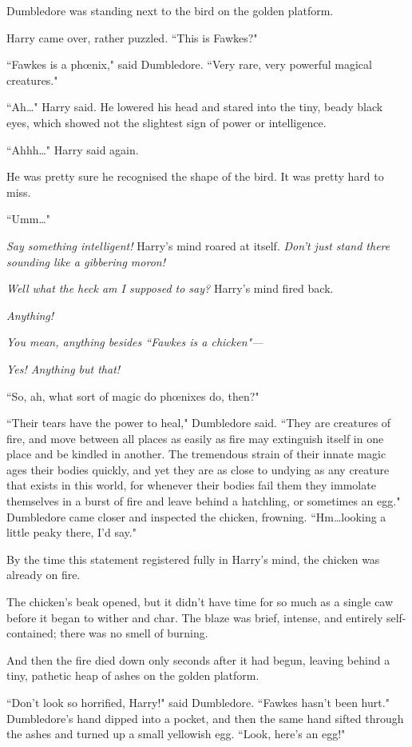 Dumbledore was standing next to the bird on the golden platform.

Harry came over, rather puzzled. ``This is Fawkes?"

``Fawkes is a phœnix," said Dumbledore. ``Very rare, very powerful magical creatures."

``Ah…" Harry said. He lowered his head and stared into the tiny, beady black eyes, which showed not the slightest sign of power or intelligence.

``Ahhh…" Harry said again.

He was pretty sure he recognised the shape of the bird. It was pretty hard to miss.

``Umm…"

\emph{Say something intelligent!} Harry's mind roared at itself. \emph{Don't just stand there sounding like a gibbering moron!}

\emph{Well what the heck am I \emph{supposed} to say?} Harry's mind fired back.

\emph{Anything!}

\emph{You mean, anything besides ``Fawkes is a chicken"—}

\emph{Yes! Anything but that!}

``So, ah, what sort of magic do phœnixes do, then?"

``Their tears have the power to heal," Dumbledore said. ``They are creatures of fire, and move between all places as easily as fire may extinguish itself in one place and be kindled in another. The tremendous strain of their innate magic ages their bodies quickly, and yet they are as close to undying as any creature that exists in this world, for whenever their bodies fail them they immolate themselves in a burst of fire and leave behind a hatchling, or sometimes an egg." Dumbledore came closer and inspected the chicken, frowning. ``Hm…looking a little peaky there, I'd say."

By the time this statement registered fully in Harry's mind, the chicken was already on fire.

The chicken's beak opened, but it didn't have time for so much as a single caw before it began to wither and char. The blaze was brief, intense, and entirely self-contained; there was no smell of burning.

And then the fire died down only seconds after it had begun, leaving behind a tiny, pathetic heap of ashes on the golden platform.

``Don't look so horrified, Harry!" said Dumbledore. ``Fawkes hasn't been hurt." Dumbledore's hand dipped into a pocket, and then the same hand sifted through the ashes and turned up a small yellowish egg. ``Look, here's an egg!"


